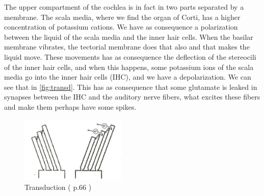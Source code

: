


The upper compartment of the cochlea is in fact in two parts separated by a membrane.
The scala media, where we find the organ of Corti, has a higher 
concentration of potassium cations. We have as consequence a polarization between
the liquid of the scala media and the inner hair cells. 
When the basilar membrane vibrates, the tectorial membrane does 
that also and that makes the liquid move. 
These movements has as consequence the deflection of the stereocili 
of the inner hair cells, and when this happens, some potassium ions of the 
scala media go into the inner hair cells (IHC), and we have a depolarization.
We can see that in \autoref{fig:transd}.
This has as consequence that some glutamate is leaked in synapses %
between the IHC and the auditory nerve fibers, what excites these fibers 
and make them perhaps have some spikes.


\begin{figure}[h]
	\centering
  \includegraphics[width=0.45\textwidth]{images/hctransd-aud66-level.jpg}
	\caption{Transduction (\cite{AuditoryNeuroscience} p.66 )}
	\label{fig:transd}
\end{figure}